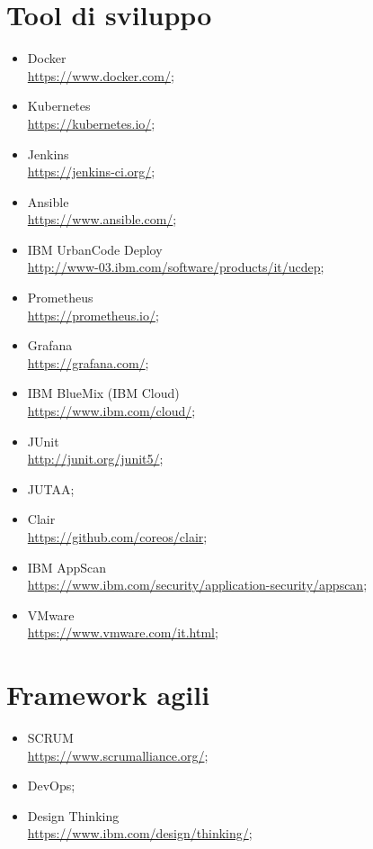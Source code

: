 \section{Tool di sviluppo}
\begin{itemize}
 \item Docker \\
\href{https://www.docker.com/}{https://www.docker.com/};
 \item Kubernetes\\
\href{https://kubernetes.io/}{https://kubernetes.io/};
 \item Jenkins\\
\href{https://jenkins-ci.org/}{https://jenkins-ci.org/};
 \item Ansible\\
\href{https://www.ansible.com/}{https://www.ansible.com/};
\item IBM UrbanCode Deploy\\
\href{http://www-03.ibm.com/software/products/it/ucdep}{http://www-03.ibm.com/software/products/it/ucdep};
\item Prometheus\\
\href{https://prometheus.io/}{https://prometheus.io/};
\item Grafana\\
\href{https://grafana.com/}{https://grafana.com/};
\item IBM BlueMix (IBM Cloud)\\
\href{https://www.ibm.com/cloud/}{https://www.ibm.com/cloud/};
\item JUnit\\
\href{http://junit.org/junit5/}{http://junit.org/junit5/};
\item JUTAA;\\
\item Clair\\
\href{https://github.com/coreos/clair}{https://github.com/coreos/clair};
\item IBM AppScan\\
\href{https://www.ibm.com/security/application-security/appscan}{https://www.ibm.com/security/application-security/appscan};
\item VMware\\
\href{https://www.vmware.com/it.html}{https://www.vmware.com/it.html};
\end{itemize}

\section{Framework agili}
\begin{itemize}
\item SCRUM\\
\href{https://www.scrumalliance.org/}{https://www.scrumalliance.org/};
\item DevOps;\\
\item Design Thinking\\
\href{https://www.ibm.com/design/thinking/}{https://www.ibm.com/design/thinking/};
\end{itemize}


